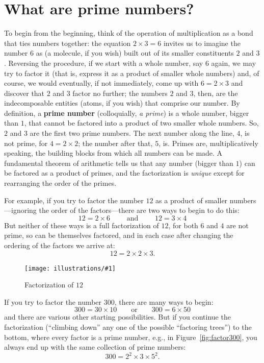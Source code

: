 \documentclass[11pt,draft]{article}
\newcommand{\ill}[3]{ 
   \begin{figure}[H]
   \begin{center}
   \texttt{[image: illustrations/\#1]}
   \caption{#3}
   \end{center}
    \end{figure}
}
\theoremstyle{plain}
\theoremstyle{definition}
\numberwithin{equation}{section}
\numberwithin{figure}{section}
\numberwithin{table}{section}
\begin{document}
            \bigskip
            
\section{What are prime numbers?}
            

 To begin from the beginning, think
of the operation of multiplication as a bond that ties numbers
together: the equation $2\times 3= 6$ invites us to imagine the number
$6$ as (a molecule, if you wish) built out of its smaller constituents
$2$ and $3$.  Reversing the procedure, if we start with a whole
number, say $6$ again, we may try to factor it (that is, express it as
a product of smaller whole numbers) and, of course, we would
eventually, if not immediately, come up with $6 = 2\times 3$ and
discover that $2$ and $3$ factor no further; the numbers $2$ and $3$,
then, are the indecomposable entities (atoms, if you wish) that
comprise our number.  By definition, a {\bf prime number}
(colloquially, {\em a prime}) is a whole number, bigger than $1$, that
cannot be factored into a product of two smaller whole numbers. So,
$2$ and $3$ are the first two prime numbers. The next number along the
line, $4$, is not prime, for $4= 2\times 2$; the number after that,
$5$, is. Primes are, multiplicatively speaking, the building blocks
from which all numbers can be made. A fundamental theorem of
arithmetic tells us that any number (bigger than $1$) can be factored
as a product of primes, and the factorization is {\em unique} except
for rearranging the order of the primes. 

For example, if you try to factor the number $12$ as a product of
smaller numbers---ignoring the order of the factors---there are two
ways to begin to do this:
$$
  12 = 2 \times 6 \qquad\text{ and }\qquad   12 = 3 \times 4
$$
But neither of these ways is a full factorization of $12$, for both
$6$ and $4$ are not prime, so can be themselves factored, and in each
case after changing the ordering of the factors we arrive at:
$$
   12= 2 \times 2 \times 3.
$$
\ill{factor_tree_12}{0.5}{Factorization of $12$}

If you try to factor the number $300$, there are many
ways to begin:
$$
  300= 30\times 10\qquad\text{or}\qquad 300 = 6 \times 50
$$
and there are various other starting possibilities. But if you continue the factorization (``climbing down'' any one of 
the possible ``factoring trees'') to the bottom, where every factor is a prime number, e.g., in
Figure~\ref{fig:factor300},
you always end up with the same collection of prime numbers:                  
                 $$300 = 2^2\times 3\times 5^2.$$   
\end{document}
